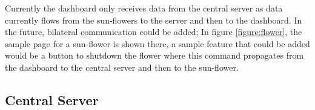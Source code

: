 Currently the dashboard only receives data from the central server as data currently flows from the sun-flowers to the server and then to the dashboard. In the future, bilateral communication could be added; In figure \ref{figure:flower}, the sample page for a sun-flower is shown there, a sample feature that could be added would be a button to shutdown the flower where this command propagates from the dashboard to the central server and then to the sun-flower.



\subsection{Central Server}
